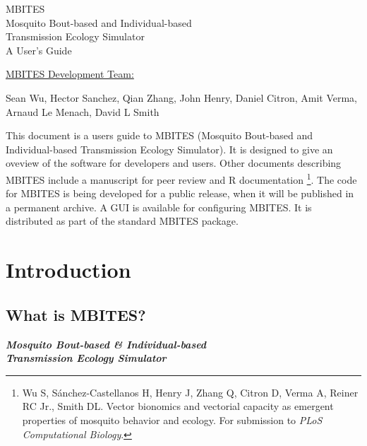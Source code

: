 \documentclass{article}
\begin{document}
\begin{centering}
\Huge{MBITES}\\
\large{Mosquito Bout-based and Individual-based \\ Transmission Ecology Simulator}\\
\vspace{0.2in}
\huge{A User's Guide} \\
\vspace{0.3in} 
\large{\underline {MBITES Development Team:}

\vspace{0.1in} 

Sean Wu, Hector Sanchez, Qian Zhang, John Henry, Daniel Citron, Amit Verma, Arnaud Le Menach, David L Smith\\}

\end{centering}




\vspace{1in}

This document is a users guide to MBITES (Mosquito Bout-based and Individual-based Transmission Ecology Simulator). It is designed to give an oveview of the software for developers and users. Other documents describing MBITES include a manuscript for peer review and R documentation \footnote{Wu S, S{\' a}nchez-Castellanos H, Henry J, Zhang Q, Citron D, Verma A, Reiner RC Jr., Smith DL. Vector bionomics and vectorial capacity as emergent properties of mosquito behavior and ecology. For submission to {\em PLoS Computational Biology}.}. The code for MBITES is being developed for a public release, when it will be published in a permanent archive. A GUI is available for configuring MBITES. It is distributed as part of the standard MBITES package. 

\clearpage 
\tableofcontents 
\clearpage 

\section{Introduction}

\subsection{What is MBITES?}

\begin{displayquote}
{\em \bf Mosquito Bout-based \& Individual-based \\Transmission Ecology Simulator}
\end{displayquote}
\end{document}
